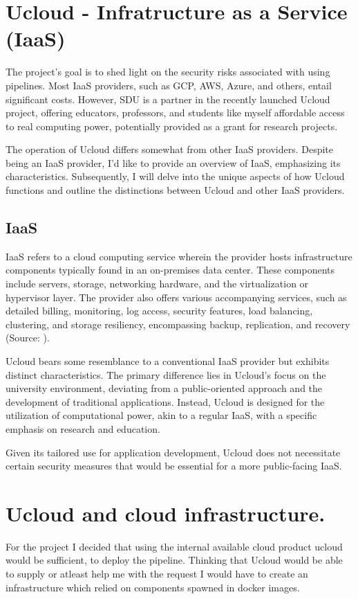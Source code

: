 \section{Ucloud - Infratructure as a Service (IaaS)}
\label{sec:ucloud}
The project's goal is to shed light on the security risks associated with using pipelines. 
Most IaaS providers, such as GCP, AWS, Azure, and others, entail significant costs. 
However, SDU is a partner in the recently launched Ucloud project, offering educators, professors, 
and students like myself affordable access to real computing power, potentially provided as a grant for research projects.

The operation of Ucloud differs somewhat from other IaaS providers. 
Despite being an IaaS provider, I'd like to provide an overview of IaaS, emphasizing its characteristics. 
Subsequently, I will delve into the unique aspects of how Ucloud functions and outline the distinctions 
between Ucloud and other IaaS providers.


\subsection{IaaS}
\label{subsec:iaas}
IaaS refers to a cloud computing service wherein the provider hosts 
infrastructure components typically found in an on-premises data center. 
These components include servers, storage, networking hardware, and the virtualization or hypervisor layer. 
The provider also offers various accompanying services, such as detailed billing, monitoring, log access, security features,
load balancing, clustering, and storage resiliency, encompassing backup, replication, and recovery (Source: \cite{iaas}).

Ucloud bears some resemblance to a conventional IaaS provider but exhibits distinct characteristics. 
The primary difference lies in Ucloud's focus on the university environment, 
deviating from a public-oriented approach and the development of traditional applications. 
Instead, Ucloud is designed for the utilization of computational power, akin to a regular IaaS, 
with a specific emphasis on research and education.

Given its tailored use for application development, 
Ucloud does not necessitate certain security measures that would be essential for a more public-facing IaaS.

\section{Ucloud and cloud infrastructure.}
\label{sec:ucloud}
For the project I decided that using the internal available cloud product ucloud would be sufficient, 
to deploy the pipeline. Thinking that Ucloud would be able to supply or atleast help me with the request I would 
have to create an infrastructure which relied on components spawned in docker images.


